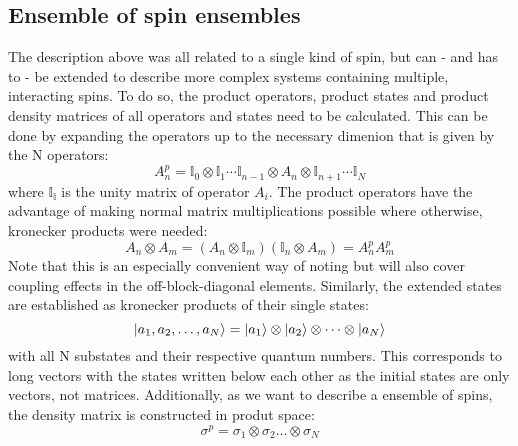         \subsection{Ensemble of spin ensembles}
            The description above was all related to a single kind of spin, but can - and has to - be extended to describe more complex systems containing multiple, interacting spins. To do so, the product operators, product states and product density matrices of all operators and states need to be calculated. This can be done by expanding the operators up to the necessary dimenion that is given by the N operators:
            \begin{equation*}
                A^p_n = \mathbb{I}_0\otimes\mathbb{I}_1\cdots \mathbb{I}_{n-1} \otimes A_n \otimes \mathbb{I}_{n+1}\cdots \mathbb{I}_N
            \end{equation*}
            where $\mathbb{I_i}$ is the unity matrix of operator $A_i$. The product operators have the advantage of making normal matrix multiplications possible where otherwise, kronecker products were needed:
            \begin{equation}
                A_n\otimes A_m = (A_n \otimes \mathbb{I}_m)(\mathbb{I}_n \otimes A_m) = A^p_nA^p_m
            \end{equation}
            Note that this is an especially convenient way of noting but will also cover coupling effects in the off-block-diagonal elements. Similarly, the extended states are established as kronecker products of their single states:
            \begin{equation}
                \ket{a_1,a_2, \dots, a_N} = \ket{a_1}\otimes\ket{a_2}\otimes\dots\otimes\ket{a_N}
            \end{equation}
            with all N substates and their respective quantum numbers. This corresponds to long vectors with the states written below each other as the initial states are only vectors, not matrices.
            Additionally, as we want to describe a ensemble of spins, the density matrix is constructed in produt space:
            \begin{equation}
                \sigma^p = \sigma_1 \otimes\sigma_2\dots\otimes\sigma_N
            \end{equation}
